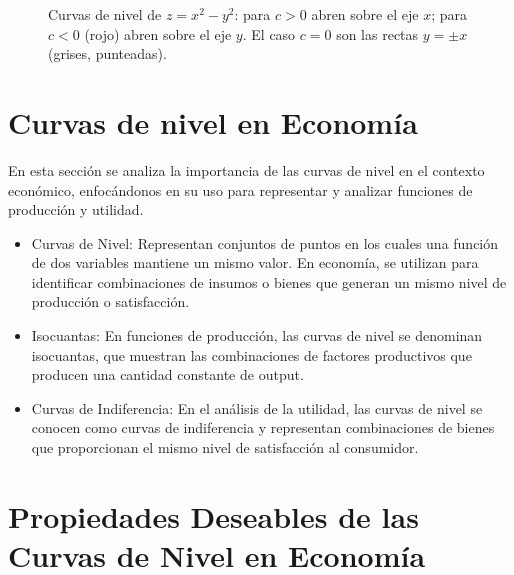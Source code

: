\documentclass{article}
\begin{document}
\begin{figure}[H]
    \caption{Curvas de nivel de \( z = x^2 - y^2 \): para \(c>0\) abren sobre el eje \(x\); para \(c<0\) (rojo) abren sobre el eje \(y\). El caso \(c=0\) son las rectas \(y=\pm x\) (grises, punteadas).}
\end{figure}





\newpage
\section{Curvas de nivel en Economía}

En esta sección se analiza la importancia de las {\color{teal}curvas de nivel} en el contexto económico, enfocándonos en su uso para representar y analizar funciones de producción y utilidad.

\begin{itemize}
    \item {\color{teal}Curvas de Nivel:} Representan conjuntos de puntos en los cuales una función de dos variables mantiene un mismo valor. En economía, se utilizan para identificar {\color{teal}combinaciones de insumos o bienes que generan un mismo nivel de producción o satisfacción}.
    \item {\color{teal}Isocuantas:} En funciones de producción, las curvas de nivel se denominan isocuantas, que muestran las {\color{teal}combinaciones de factores productivos que producen una cantidad constante de output}.
    \item {\color{teal}Curvas de Indiferencia:} En el análisis de la utilidad, las curvas de nivel se conocen como curvas de indiferencia y representan {\color{teal}combinaciones de bienes que proporcionan el mismo nivel de satisfacción al consumidor}.
\end{itemize}



\section*{Propiedades Deseables de las Curvas de Nivel en Economía}
\end{document}
